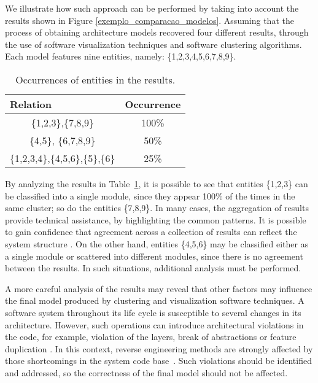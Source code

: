 We illustrate how such approach can be performed by taking into account the results shown in Figure \ref{exemplo_comparacao_modelos}. Assuming that the process of obtaining architecture models recovered four different results, through the use of software visualization techniques and software clustering algorithms. Each model features nine entities, namely: \{1,2,3,4,5,6,7,8,9\}. 

\begin{table}[h]
	\centering
	\caption{Occurrences of entities in the results.}
	\label{ocorrencias_1}
	\begin{tabular}{|cc|}
		\hline
		\multicolumn{1}{|l}{Relation} & \multicolumn{1}{l|}{Occurrence} \\ \hline
		\{1,2,3\},\{7,8,9\}                  & 100\%                           \\ \hline
		\{4,5\}, \{6,7,8,9\}                    & 50\%                          \\ \hline
		\{1,2,3,4\},\{4,5,6\},\{5\},\{6\}                  & 25\%           \\ \hline
	\end{tabular}
\end{table}

By analyzing the results in Table~\ref{ocorrencias_1}, it is possible to see that entities \{1,2,3\} can be classified into a single module, since they appear 100\% of the times in the same cluster; so do the entities \{7,8,9\}. In many cases, the aggregation of results provide technical assistance, by highlighting the common patterns. It is possible to gain confidence that agreement across a collection of results can reflect the system structure \cite{craft}. On the other hand, entities \{4,5,6\} may be classified either as a single module or scattered into different modules, since there is no agreement between the results. In such situations, additional analysis must be performed. 

A more careful analysis of the results may reveal that other factors may influence the final model produced by clustering and visualization software techniques. A software system throughout its life cycle is susceptible to several changes in its architecture. However, such operations can introduce architectural violations in the code, for example, violation of the layers, break of abstractions or feature duplication \cite{kazman_view_1998}. In this context, reverse engineering methods are strongly affected by those shortcomings in the system code base~\cite{Platenius_2012}.  Such violations should be identified and addressed, so the correctness of the final model should not be affected.

